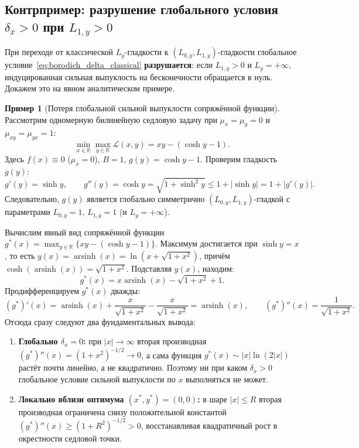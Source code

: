 \documentclass[11pt, a4paper]{article}
\theoremstyle{definition}
\newtheorem{example}{Пример}[section]
\begin{document}
\subsection{Контрпример: разрушение глобального условия $\delta_x > 0$ при $L_{1,y} > 0$}

При переходе от классической $L_y$-гладкости к $(L_{0,y}, L_{1,y})$-гладкости глобальное условие~\eqref{eq:borodich_delta_classical} \textbf{разрушается}: если $L_{1,y} > 0$ и $L_y = +\infty$, индуцированная сильная выпуклость на бесконечности обращается в нуль. Докажем это на явном аналитическом примере.

\begin{example}[Потеря глобальной сильной выпуклости сопряжённой функции]\label{ex:cosh_counterexample}
Рассмотрим одномерную билинейную седловую задачу при $\mu_x = \mu_y = 0$ и $\mu_{xy} = \mu_{yx} = 1$:
\[
\min_{x \in \mathbb{R}} \max_{y \in \mathbb{R}} \mathcal{L}(x, y) = x y - (\cosh y - 1).
\]
Здесь $f(x) \equiv 0$ ($\mu_x = 0$), $B = 1$, $g(y) = \cosh y - 1$. Проверим гладкость $g(y)$:
\[
g'(y) = \sinh y, \qquad g''(y) = \cosh y = \sqrt{1 + \sinh^2 y} \le 1 + |\sinh y| = 1 + |g'(y)|.
\]
Следовательно, $g(y)$ является глобально симметрично $(L_{0,y}, L_{1,y})$-гладкой с параметрами $L_{0,y} = 1$, $L_{1,y} = 1$ (и $L_y = +\infty$).

Вычислим явный вид сопряжённой функции $g^*(x) = \max_{y \in \mathbb{R}} \{x y - (\cosh y - 1)\}$. Максимум достигается при $\sinh y = x$, то есть $y(x) = \operatorname{arsinh}(x) = \ln(x + \sqrt{1 + x^2})$, причём $\cosh(\operatorname{arsinh}(x)) = \sqrt{1 + x^2}$. Подставляя $y(x)$, находим:
\[
g^*(x) = x \operatorname{arsinh}(x) - \sqrt{1 + x^2} + 1.
\]
Продифференцируем $g^*(x)$ дважды:
\[
(g^*)'(x) = \operatorname{arsinh}(x) + \frac{x}{\sqrt{1 + x^2}} - \frac{x}{\sqrt{1 + x^2}} = \operatorname{arsinh}(x), \qquad (g^*)''(x) = \frac{1}{\sqrt{1 + x^2}}.
\]
Отсюда сразу следуют два фундаментальных вывода:
\begin{enumerate}
    \item \textbf{Глобально $\delta_x = 0$:} при $|x| \to \infty$ вторая производная $(g^*)''(x) = (1 + x^2)^{-1/2} \to 0$, а сама функция $g^*(x) \sim |x| \ln(2|x|)$ растёт почти линейно, а не квадратично. Поэтому ни при каком $\delta_x > 0$ глобальное условие сильной выпуклости по $x$ выполняться не может.
    \item \textbf{Локально вблизи оптимума $(x^*, y^*) = (0, 0)$:} в шаре $|x| \le R$ вторая производная ограничена снизу положительной константой $(g^*)''(x) \ge (1 + R^2)^{-1/2} > 0$, восстанавливая квадратичный рост в окрестности седловой точки.
\end{enumerate}
\end{example}
\end{document}
